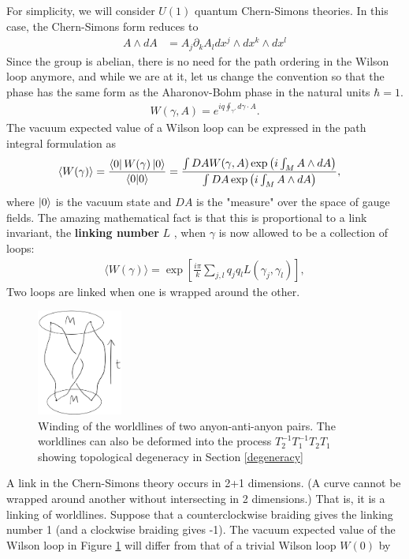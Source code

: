 \documentclass[aps,nofootinbib]{revtex4}
\begin{document}
For simplicity, we will consider $U(1)$ quantum Chern-Simons theories. In this case, the Chern-Simons form reduces to
\begin{align}
A \wedge dA &= A_j \partial_k A_l dx^j \wedge dx^k \wedge dx^l
\end{align}
Since the group is abelian, there is no need for the path ordering in the Wilson loop anymore, and while we are at it, let us change the convention so that the phase has the same form as the Aharonov-Bohm phase in the natural units $\hbar = 1$.
\begin{align}\label{physicist wilson loop}
W(\gamma,A) = e^{iq\oint_{\gamma'} d\gamma \cdot A}. 
\end{align}
The vacuum expected value of a Wilson loop can be expressed in the path integral formulation as
\begin{align}
\langle W(\gamma) \rangle  
	&= \frac{ \bra{0} W(\gamma) \ket{0} }{ \braket{0|0} }
	= \frac{\int DA W(\gamma,A) \exp \left( i\int_M A \wedge dA \right)}{\int DA \exp \left( i\int_M A \wedge dA \right)}, 
\end{align}
where $\ket{0}$ is the vacuum state and $DA$ is the "measure" over the space of gauge fields. The amazing mathematical fact is that this is proportional to a link invariant, the {\bf linking number} $L$ \cite{Pachos12}, when $\gamma$ is now allowed to be a collection of loops:
\begin{align}\label{link formula}
\langle W (\gamma) \rangle = \exp \left[ \frac{i \pi}{k} \sum_{j,l} q_j q_l L(\gamma_j,\gamma_l) \right],
\end{align}
Two loops are linked when one is wrapped around the other. 
\begin{figure}\label{winding}
\includegraphics[width=0.25\textwidth]{linking.png}
\caption{Winding of the worldlines of two anyon-anti-anyon pairs. The worldlines can also be deformed into the process $T_2^{-1} T_1^{-1} T_2 T_1$ showing topological degeneracy in Section \ref{degeneracy}}
\end{figure}
A link in the Chern-Simons theory occurs in 2+1 dimensions. (A curve cannot be wrapped around another without intersecting in 2 dimensions.) That is, it is a linking of worldlines. Suppose that a counterclockwise braiding gives the linking number 1 (and a clockwise braiding gives -1). The vacuum expected value of the Wilson loop in Figure \ref{winding} will differ from that of a trivial Wilson loop $W(0)$ by
\end{document}
